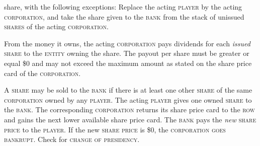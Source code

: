 \documentclass[8pt]{extarticle}
\newenvironment{my_description}
  {\begin{list}{}{\setlength{\labelwidth}{0pt}
   \leftmargin=1.2em
   \setlength{\itemindent}{-\leftmargin}
   \renewcommand{\makelabel}{\descriptionlabel}}
  \setlength{\itemsep}{1pt}
  \setlength{\parskip}{0pt}
  \setlength{\parsep}{0pt}
  }
  {\end{list}}
\begin{document}
\begin{small}
\begin{multicols}{2}
{\begin{my_description}
{    share}, with the following exceptions: Replace the acting
  \textsc{player} by the acting \textsc{corporation}, and take the
  share given to the \textsc{bank} from the stack of unissued
  \textsc{shares} of the acting \textsc{corporation}.
\item[Pay dividends] From the money it owns, the acting
  \textsc{corporation} pays dividends for each \emph{issued}
  \textsc{share} to the \textsc{entity} owning the share. The payout
  per share must be greater or equal \$0 and may not exceed the
  maximum amount as stated on the share price card of the
  \textsc{corporation}.
\item[Sell one share] A \textsc{share} may be sold to the
  \textsc{bank} if there is at least one other
  \textsc{share} of the same \textsc{corporation} owned by any
  \textsc{player}.  The acting \textsc{player} gives one owned
  \textsc{share} to the \textsc{bank}. The corresponding
  \textsc{corporation} returns its share price card to the
  \textsc{row} and gains the next lower available share price
  card. The \textsc{bank} pays the \emph{new} \textsc{share price} to
  the \textsc{player}. If the new \textsc{share price} is \$0, the
  \textsc{corporation} \textsc{goes bankrupt}. Check for
  \textsc{change of presidency}.
\end{my_description}

}

\end{multicols}
\end{small}
\end{document}
